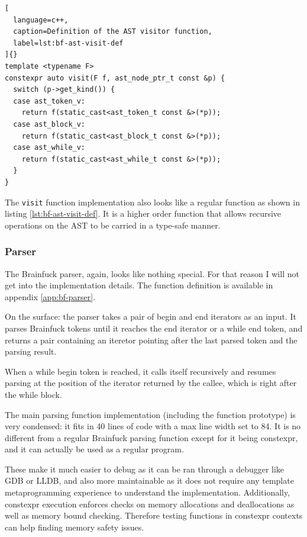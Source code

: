 \documentclass[../main]{subfiles}
\begin{document}
\begin{lstlisting}[
  language=c++,
  caption=Definition of the AST visitor function,
  label=lst:bf-ast-visit-def
]{}
template <typename F>
constexpr auto visit(F f, ast_node_ptr_t const &p) {
  switch (p->get_kind()) {
  case ast_token_v:
    return f(static_cast<ast_token_t const &>(*p));
  case ast_block_v:
    return f(static_cast<ast_block_t const &>(*p));
  case ast_while_v:
    return f(static_cast<ast_while_t const &>(*p));
  }
}
\end{lstlisting}

The \lstinline{visit} function implementation also looks like a regular \cpp
function as shown in listing \ref{lst:bf-ast-visit-def}.
It is a higher order function that allows recursive operations on the AST to be
carried in a type-safe manner.

\subsubsection{
  Parser
}

The Brainfuck parser, again, looks like nothing special. For that reason I will
not get into the implementation details. The function definition is available
in appendix \ref{app:bf-parser}.

On the surface: the parser takes a pair of begin and end iterators as an input.
It parses Brainfuck tokens until it reaches the end iterator or a while end
token, and returns a pair containing an iteretor pointing after the last parsed
token and the parsing result.

When a while begin token is reached, it calls itself recursively and resumes
parsing at the position of the iterator returned by the callee, which is right
after the while block.

The main parsing function implementation (including the function prototype)
is very condensed: it fits in 40 lines of code with a max line width set to 84.
It is no different from a regular Brainfuck parsing function except for it being
\gls{constexpr}, and it can actually be used as a regular \cpp program.

These make it much easier to debug as it can be ran through a \cpp debugger like
GDB or LLDB, and also more maintainable as it does not require any
template metaprogramming experience to understand the implementation.
Additionally, \gls{constexpr} execution enforces checks on memory allocations and
deallocations as well as memory bound checking. Therefore testing functions
in \gls{constexpr} contexts can help finding memory safety issues.
\end{document}
